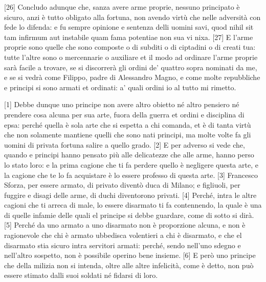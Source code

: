 \quebra

{[}26{]} Concludo adunque che, sanza avere arme proprie, nessuno
principato è sicuro, anzi è tutto obligato alla fortuna, non avendo
virtù che nelle adversità con fede lo difenda: e fu sempre opinione e
sentenza delli uomini savi, quod nihil sit tam infirmum aut instabile
quam fama potentiae non sua vi nixa. {[}27{]} E l'arme proprie sono
quelle che sono composte o di subditi o di ciptadini o di creati tua:
tutte l'altre sono o mercennarie o auxiliare et il modo ad ordinare
l'arme proprie sarà facile a trovare, se si discorrerà gli ordini de'
quattro sopra nominati da me, e se si vedrà come Filippo, padre di
Alessandro Magno, e come molte repubbliche e principi si sono armati et
ordinati: a' quali ordini io al tutto mi rimetto.


{[}1{]} Debbe dunque uno principe non avere altro obietto né altro
pensiero né prendere cosa alcuna per sua arte, fuora della guerra et
ordini e disciplina di epsa: perché quella è sola arte che si espetta a
chi comanda, et è di tanta virtù che non solamente mantiene quelli che
sono nati principi, ma molte volte fa gli uomini di privata fortuna
salire a quello grado. {[}2{]} E per adverso si vede che, quando e
principi hanno pensato più alle delicatezze che alle arme, hanno perso
lo stato loro: e la prima cagione che ti fa perdere quello è negligere
questa arte, e la cagione che te lo fa acquistare è lo essere professo
di questa arte. {[}3{]} Francesco Sforza, per essere armato, di privato
diventò duca di Milano; e figliuoli, per fuggire e disagi delle arme, di
duchi diventorono privati. {[}4{]} Perché, intra le altre cagioni che ti
arreca di male, lo essere disarmato ti fa contennendo, la quale è una di
quelle infamie delle quali el principe si debbe guardare, come di sotto
si dirà. {[}5{]} Perché da uno armato a uno disarmato non è proporzione
alcuna, e non è ragionevole che chi è armato ubbedisca volentieri a chi
è disarmato, e che el disarmato stia sicuro intra servitori armati:
perché, sendo nell'uno sdegno e nell'altro sospetto, non è possibile
operino bene insieme. {[}6{]} E però uno principe che della milizia non
si intenda, oltre alle altre infelicità, come è detto, non può essere
stimato dalli suoi soldati né fidarsi di loro.

